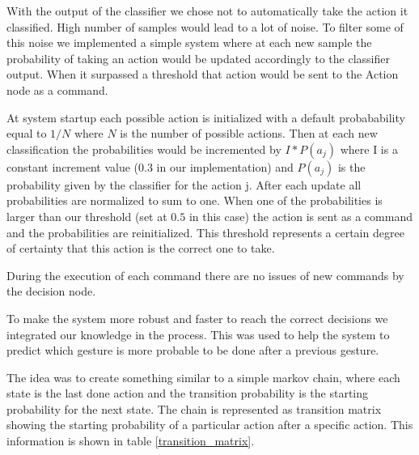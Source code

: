 With the output of the classifier we chose not to automatically take the action it classified. High number of samples would lead to a lot of noise. To filter some of this noise we implemented a simple system where at each new sample the probability of taking an action would be updated accordingly to the classifier output. When it surpassed a threshold that action would be sent to the Action node as a command.

At system startup each possible action is initialized with a default probabability equal to $1/N$ where $N$ is the number of possible actions.
Then at each new classification the probabilities would be incremented by $I*P(a_j)$ where I is a constant increment value ($0.3$ in our implementation) and $P(a_j)$ is the probability given by the classifier for the action j.
After each update all probabilities are normalized to sum to one.
When one of the probabilities is larger than our threshold (set at $0.5$ in this case) the action is sent as a command and the probabilities are reinitialized. This threshold represents a certain degree of certainty that this action is the correct one to take.

During the execution of each command there are no issues of new commands by the decision node.

To make the system more robust and faster to reach the correct decisions we integrated our knowledge in the process. This was used to help the system to predict which gesture is more probable to be done after a previous gesture.

The idea was to create something similar to a simple markov chain, where each state is the last done action and the transition
probability is the starting probability for the next state.
The chain is represented as transition matrix showing the starting probability of a particular action after a specific action. This information is shown in table \ref{transition_matrix}.

